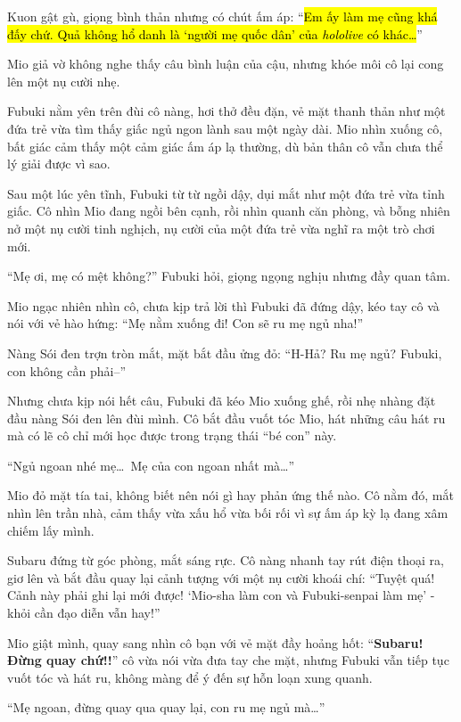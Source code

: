 \documentclass[../main.tex]{subfiles}
\begin{document}
Kuon gật gù, giọng bình thản nhưng có chút ấm áp: ``\hl{Em ấy làm mẹ cũng khá đấy chứ. Quả không hổ danh là `người mẹ quốc dân' của \textit{hololive} có khác\dots}''

Mio giả vờ không nghe thấy câu bình luận của cậu, nhưng khóe môi cô lại cong lên một nụ cười nhẹ.

Fubuki nằm yên trên đùi cô nàng, hơi thở đều đặn, vẻ mặt thanh thản như một đứa trẻ vừa tìm thấy giấc ngủ ngon lành sau một ngày dài. Mio nhìn xuống cô, bất giác cảm thấy một cảm giác ấm áp lạ thường, dù bản thân cô vẫn chưa thể lý giải được vì sao.

\ct

Sau một lúc yên tĩnh, Fubuki từ từ ngồi dậy, dụi mắt như một đứa trẻ vừa tỉnh giấc. Cô nhìn Mio đang ngồi bên cạnh, rồi nhìn quanh căn phòng, và bỗng nhiên nở một nụ cười tinh nghịch, nụ cười của một đứa trẻ vừa nghĩ ra một trò chơi mới.

``Mẹ ơi, mẹ có mệt không?'' Fubuki hỏi, giọng ngọng nghịu nhưng đầy quan tâm.

Mio ngạc nhiên nhìn cô, chưa kịp trả lời thì Fubuki đã đứng dậy, kéo tay cô và nói với vẻ hào hứng: ``Mẹ nằm xuống đi! Con sẽ ru mẹ ngủ nha!''

Nàng Sói đen trợn tròn mắt, mặt bắt đầu ửng đỏ: ``H-Hả? Ru mẹ ngủ? Fubuki, con không cần phải--''

Nhưng chưa kịp nói hết câu, Fubuki đã kéo Mio xuống ghế, rồi nhẹ nhàng đặt đầu nàng Sói đen lên đùi mình. Cô bắt đầu vuốt tóc Mio, hát những câu hát ru mà có lẽ cô chỉ mới học được trong trạng thái ``bé con'' này.

``Ngủ ngoan nhé mẹ\dots\ Mẹ của con ngoan nhất mà\dots''

Mio đỏ mặt tía tai, không biết nên nói gì hay phản ứng thế nào. Cô nằm đó, mắt nhìn lên trần nhà, cảm thấy vừa xấu hổ vừa bối rối vì sự ấm áp kỳ lạ đang xâm chiếm lấy mình.


Subaru đứng từ góc phòng, mắt sáng rực. Cô nàng nhanh tay rút điện thoại ra, giơ lên và bắt đầu quay lại cảnh tượng với một nụ cười khoái chí: ``Tuyệt quá! Cảnh này phải ghi lại mới được! `Mio-sha làm con và Fubuki-senpai làm mẹ' - khỏi cần đạo diễn vẫn hay!''

Mio giật mình, quay sang nhìn cô bạn với vẻ mặt đầy hoảng hốt: ``\textbf{Subaru! Đừng quay chứ!!}'' cô vừa nói vừa đưa tay che mặt, nhưng Fubuki vẫn tiếp tục vuốt tóc và hát ru, không màng để ý đến sự hỗn loạn xung quanh.

``Mẹ ngoan, đừng quay qua quay lại, con ru mẹ ngủ mà\dots''
\end{document}
